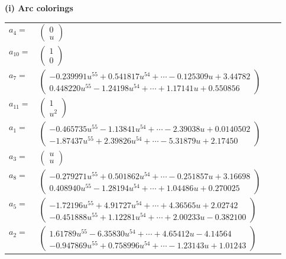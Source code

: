 \documentclass[1p]{elsarticle_modified}
\theoremstyle{definition}
\begin{document}
\flushleft \textbf{(i) Arc colorings}\\
\begin{tabular}{m{7pt} m{180pt} m{7pt} m{180pt} }
\flushright $a_{4}=$&$\begin{pmatrix}0\\u\end{pmatrix}$ \\
\flushright $a_{10}=$&$\begin{pmatrix}1\\0\end{pmatrix}$ \\
\flushright $a_{7}=$&$\begin{pmatrix}-0.239991 u^{55}+0.541817 u^{54}+\cdots-0.125309 u+3.44782\\0.448220 u^{55}-1.24198 u^{54}+\cdots+1.17141 u+0.550856\end{pmatrix}$ \\
\flushright $a_{11}=$&$\begin{pmatrix}1\\u^2\end{pmatrix}$ \\
\flushright $a_{1}=$&$\begin{pmatrix}-0.465735 u^{55}-1.13841 u^{54}+\cdots-2.39038 u+0.0140502\\-1.87437 u^{55}+2.39826 u^{54}+\cdots-5.31879 u+2.17450\end{pmatrix}$ \\
\flushright $a_{3}=$&$\begin{pmatrix}u\\u\end{pmatrix}$ \\
\flushright $a_{8}=$&$\begin{pmatrix}-0.279271 u^{55}+0.501862 u^{54}+\cdots-0.251857 u+3.16698\\0.408940 u^{55}-1.28194 u^{54}+\cdots+1.04486 u+0.270025\end{pmatrix}$ \\
\flushright $a_{5}=$&$\begin{pmatrix}-1.72196 u^{55}+4.91727 u^{54}+\cdots+4.36565 u+2.02742\\-0.451888 u^{55}+1.12281 u^{54}+\cdots+2.00233 u-0.382100\end{pmatrix}$ \\
\flushright $a_{2}=$&$\begin{pmatrix}1.61789 u^{55}-6.35830 u^{54}+\cdots+4.65412 u-4.14564\\-0.947869 u^{55}+0.758996 u^{54}+\cdots-1.23143 u+1.01243\end{pmatrix}$ \\

\end{tabular}
\end{document}
